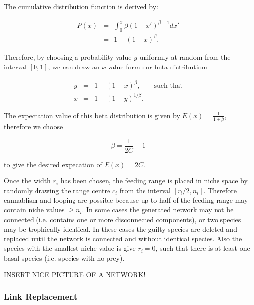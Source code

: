 The cumulative distribution function is derived by:

\begin{eqnarray*}
P(x) &=& \int_{0}^{x} \beta (1-x')^{\beta - 1} dx' \\
     &=& 1 - (1-x)^\beta . 
\label{eq:beta_cdf}                         
\end{eqnarray*}

Therefore, by choosing a probability value $y$ uniformly at random from the interval $[0,1]$, we can draw an $x$ value form our beta distribution:
 
\begin{eqnarray*}
y &=&  1 - (1-x)^\beta, \qquad \text{such that} \\[5pt]
x &=&  1 - (1- y)^{1/\beta}.                          
\label{eq:beta_sampling}
\end{eqnarray*}

The expectation value of this beta distribution is given by $E (x) = \frac{1}{1 + \beta}$, therefore we choose

\begin{equation*}
\beta = \frac{1}{2C} - 1
\label{eq:beta_value}
\end{equation*}

to give the desired expecation of $E(x) = 2C$.

Once the width $r_i$ has been chosen, the feeding range is placed in niche space by randomly drawing the range centre $c_i$ from the interval $[r_i/2, n_i]$. Therefore cannablism and looping are possible because up to half of the feeding range may contain niche values $\geq n_i$. In some cases the generated network may not be connected (i.e. contains one or more disconnected components), or two species may be trophically identical. In these cases the guilty species are deleted and replaced until the network is connected and without identical species. Also the species with the smallest niche value is give $r_i = 0$, such that there is at least one basal species (i.e. species with no prey). 

INSERT NICE PICTURE OF A NETWORK!


\subsubsection{Link Replacement}
\label{sec:link_replacement}


